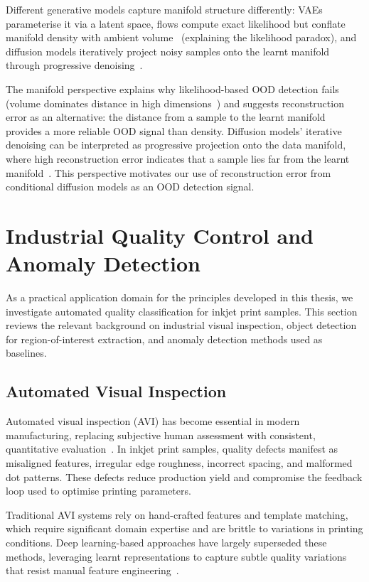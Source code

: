 Different generative models capture manifold structure differently: VAEs parameterise it via a latent space, flows compute exact likelihood but conflate manifold density with ambient volume~\cite{kirichenko2020why, lelan2021volumes} (explaining the likelihood paradox), and diffusion models iteratively project noisy samples onto the learnt manifold through progressive denoising~\cite{karras2024analyzing}.

The manifold perspective explains why likelihood-based OOD detection fails (volume dominates distance in high dimensions~\cite{fefferman2016manifold, pope2021intrinsic}) and suggests reconstruction error as an alternative: the distance from a sample to the learnt manifold provides a more reliable OOD signal than density. Diffusion models' iterative denoising can be interpreted as progressive projection onto the data manifold, where high reconstruction error indicates that a sample lies far from the learnt manifold~\cite{wyatt2022anoddpm}. This perspective motivates our use of reconstruction error from conditional diffusion models as an OOD detection signal.


\section{Industrial Quality Control and Anomaly Detection}
\label{sec:bg:industrial}

As a practical application domain for the principles developed in this thesis, we investigate automated quality classification for inkjet print samples. This section reviews the relevant background on industrial visual inspection, object detection for region-of-interest extraction, and anomaly detection methods used as baselines.

\subsection{Automated Visual Inspection}
\label{sec:bg:industrial:avi}

Automated visual inspection (AVI) has become essential in modern manufacturing, replacing subjective human assessment with consistent, quantitative evaluation~\cite{czimmermann2020visual}. In inkjet print samples, quality defects manifest as misaligned features, irregular edge roughness, incorrect spacing, and malformed dot patterns. These defects reduce production yield and compromise the feedback loop used to optimise printing parameters.

Traditional AVI systems rely on hand-crafted features and template matching, which require significant domain expertise and are brittle to variations in printing conditions. Deep learning-based approaches have largely superseded these methods, leveraging learnt representations to capture subtle quality variations that resist manual feature engineering~\cite{akcay2022anomalib}.

